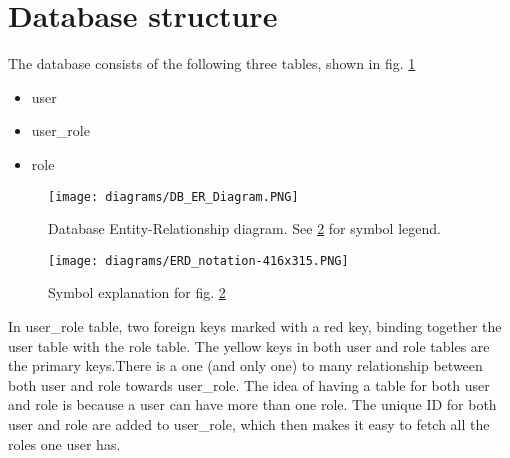 \clearpage
\section{Database structure}

The database consists of the following three tables, shown in fig. \ref{fig:DB_ER} 
\begin{itemize}
    \item user
    \item user\_role
    \item role
\end{itemize}

\begin{figure}[H]
    \centering
    \texttt{[image: diagrams/DB\_ER\_Diagram.PNG]}
    \caption{Database Entity-Relationship diagram. See \ref{fig:DB_ER_legend} for symbol legend.}
    \label{fig:DB_ER}
\end{figure}

\begin{figure}[H]
    \centering
    \texttt{[image: diagrams/ERD\_notation-416x315.PNG]}
    \caption{Symbol explanation for fig. \ref{fig:DB_ER_legend}}
    \label{fig:DB_ER_legend}
\end{figure}

\noindent In user\_role table, two foreign keys marked with a red key, binding together the user table with the role table.
The yellow keys in both user and role tables are  the primary keys.There is a one (and only one) to many 
relationship between both user and role towards user\_role. The idea of having a table for both user and role is 
because a user can have more than one role. The unique ID for both user and role are added to user\_role, which then 
makes it easy to fetch all the roles one user has. 